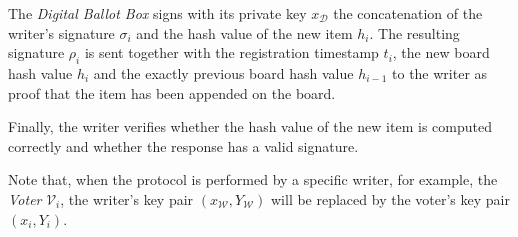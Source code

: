 The \textit{Digital Ballot Box} signs with its private key $x_\mathcal{D}$ the concatenation of the writer's signature $\sigma_i$ and the hash value of the new item $h_i$. The resulting signature $\rho_i$ is sent together with the registration timestamp $t_i$, the new board hash value $h_i$ and the exactly previous board hash value $h_{i-1}$ to the writer as proof that the item has been appended on the board.

Finally, the writer verifies whether the hash value of the new item is computed correctly and whether the response has a valid signature.

Note that, when the protocol is performed by a specific writer, for example, the \textit{Voter} $\mathcal{V}_i$, the writer's key pair $(x_\mathcal{W}, Y_\mathcal{W})$ will be replaced by the voter's key pair $(x_i, Y_i)$.






